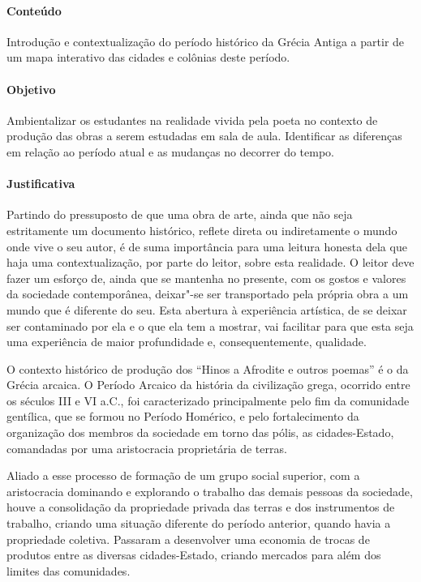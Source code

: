 \documentclass[12pt]{extarticle}
\begin{document}
\paragraph{Conteúdo} Introdução e contextualização do período histórico
da Grécia Antiga a partir de um mapa interativo das cidades e colônias 
deste período.

\paragraph{Objetivo} Ambientalizar os estudantes na realidade vivida pela
poeta no contexto de produção das obras a serem estudadas em sala de aula.
Identificar as diferenças em relação ao período atual e as mudanças no decorrer
do tempo.

\paragraph{Justificativa} Partindo do pressuposto de que uma obra de arte, ainda
que não seja estritamente um documento histórico, reflete direta ou indiretamente
o mundo onde vive o seu autor, é de suma importância para uma leitura honesta
dela que haja uma contextualização, por parte do leitor, sobre esta realidade. 
O leitor deve fazer um esforço de, ainda que se mantenha no presente, com os
gostos e valores da sociedade contemporânea, deixar"-se ser transportado
pela própria obra a um mundo que é diferente do seu. Esta abertura à experiência
artística, de se deixar ser contaminado por ela e o que ela tem a mostrar,
vai facilitar para que esta seja uma experiência de maior profundidade e, 
consequentemente, qualidade. 

O contexto histórico de produção dos ``Hinos a Afrodite e outros poemas'' 
é o da Grécia arcaica. O Período Arcaico da história da civilização grega, 
ocorrido entre os séculos \textsc{III} e \textsc{VI} a.C., foi caracterizado 
principalmente pelo fim da comunidade gentílica, que se formou no Período 
Homérico, e pelo fortalecimento da organização dos membros da sociedade em 
torno das pólis, as cidades-Estado, comandadas por uma aristocracia proprietária de terras.

Aliado a esse processo de formação de um grupo social superior, com a aristocracia 
dominando e explorando o trabalho das demais pessoas da sociedade, houve a consolidação 
da propriedade privada das terras e dos instrumentos de trabalho, criando uma situação 
diferente do período anterior, quando havia a propriedade coletiva. Passaram a desenvolver 
uma economia de trocas de produtos entre as diversas cidades-Estado, criando mercados para 
além dos limites das comunidades.
\end{document}
